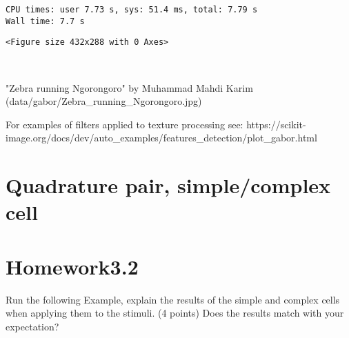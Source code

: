 \documentclass[11pt]{article}
\begin{document}
    \begin{Verbatim}[commandchars=\\\{\}]
CPU times: user 7.73 s, sys: 51.4 ms, total: 7.79 s
Wall time: 7.7 s

    \end{Verbatim}

    
    \begin{verbatim}
<Figure size 432x288 with 0 Axes>
    \end{verbatim}

    
    \begin{center}
    \end{center}
    { \hspace*{\fill} \\}
    
    "Zebra running Ngorongoro" by Muhammad Mahdi Karim
(data/gabor/Zebra\_running\_Ngorongoro.jpg)

    For examples of filters applied to texture processing see:
https://scikit-image.org/docs/dev/auto\_examples/features\_detection/plot\_gabor.html

    \section{Quadrature pair, simple/complex
cell}\label{quadrature-pair-simplecomplex-cell}

    \section{Homework3.2}\label{homework3.2}

Run the following Example, explain the results of the simple and complex
cells when applying them to the stimuli. (4 points) Does the results
match with your expectation?
\end{document}
